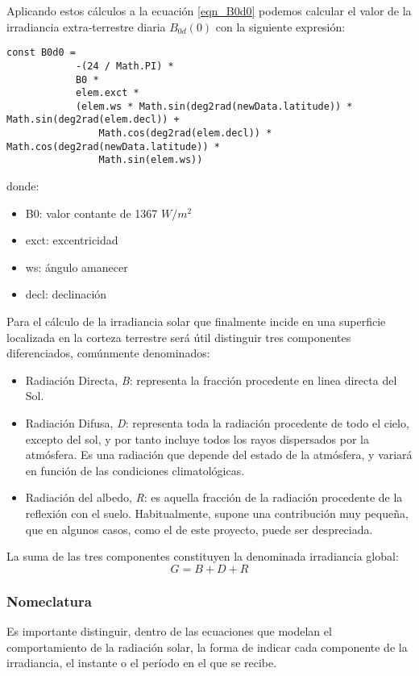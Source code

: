 Aplicando estos cálculos a la ecuación \ref{eqn_B0d0} podemos calcular el valor de la irradiancia extra-terrestre diaria $B_{0d}(0)$ con la siguiente expresión:
\begin{lstlisting}[style=ES6, caption={Equación para B0d0}]
		const B0d0 =
			-(24 / Math.PI) *
			B0 *
			elem.exct *
			(elem.ws * Math.sin(deg2rad(newData.latitude)) * Math.sin(deg2rad(elem.decl)) +
				Math.cos(deg2rad(elem.decl)) * Math.cos(deg2rad(newData.latitude)) * 
				Math.sin(elem.ws))
\end{lstlisting}
donde:
\begin{itemize}
\item B0: valor contante de 1367 $W/m^2$
\item exct: excentricidad
\item ws: ángulo amanecer
\item decl: declinación
\end{itemize}
Para el cálculo de la irradiancia solar que finalmente incide en una superficie localizada en la corteza terrestre será útil distinguir tres componentes diferenciados, comúnmente denominados:

\begin{itemize}
\item Radiación Directa, \textit{B}: representa la fracción procedente en linea directa del Sol.
\item Radiación Difusa, \textit{D}: representa toda la radiación procedente de todo el cielo, excepto del sol, y por tanto incluye todos los rayos dispersados por la atmósfera. Es una radiación que depende del estado de la atmósfera, y variará en función de las condiciones climatológicas.
\item Radiación del albedo, \textit{R}: es aquella fracción de la radiación procedente de la reflexión con el suelo. Habitualmente, supone una contribución muy pequeña, que en algunos casos, como el de este proyecto, puede ser despreciada.
\end{itemize}

La suma de las tres componentes constituyen la denominada irradiancia global:
\begin{equation}
G=B+D+R
\end{equation}
\label{equation:eqn_global_radiation}
\subsubsection{Nomeclatura}

Es importante distinguir, dentro de las ecuaciones que modelan el comportamiento de la radiación solar, la forma de indicar cada componente de la irradiancia, el instante o el período en el que se recibe. 

